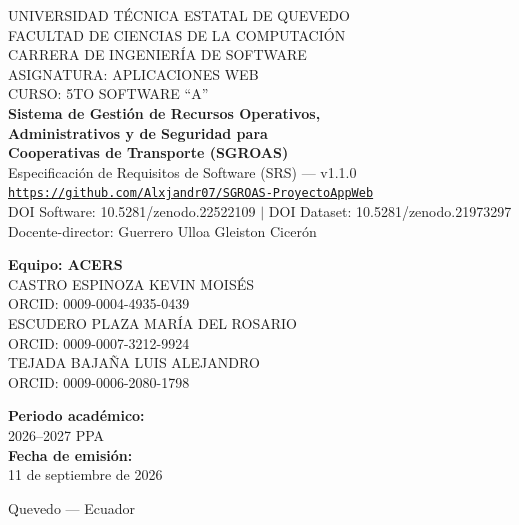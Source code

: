 \documentclass[12pt,a4paper]{article}
\begin{document}
\begin{titlepage}
\centering
\vspace*{0.6cm}
{\Large UNIVERSIDAD TÉCNICA ESTATAL DE QUEVEDO}\\[0.2cm]
{\Large FACULTAD DE CIENCIAS DE LA COMPUTACIÓN}\\[0.2cm]
{\Large CARRERA DE INGENIERÍA DE SOFTWARE}\\[0.4cm]
{\large ASIGNATURA: APLICACIONES WEB}\\[0.2cm]
{\large CURSO: 5TO SOFTWARE ``A''}\\[1.2cm]
{\LARGE \textbf{Sistema de Gestión de Recursos Operativos,}}\\[0.2cm]
{\LARGE \textbf{Administrativos y de Seguridad para}}\\[0.2cm]
{\LARGE \textbf{Cooperativas de Transporte (SGROAS)}}\\[0.6cm]
{\large Especificación de Requisitos de Software (SRS) --- v1.1.0}\\[0.4cm]
{\small \texttt{\href{https://github.com/Alxjandr07/SGROAS-ProyectoAppWeb}{https://github.com/Alxjandr07/SGROAS-ProyectoAppWeb}}}\\[0.2cm]
{\small DOI Software: 10.5281/zenodo.22522109 $\vert$ DOI Dataset: 10.5281/zenodo.21973297}\\[1.0cm]
{\small Docente-director: Guerrero Ulloa Gleiston Cicerón}\\[0.8cm]
\begin{minipage}{0.5\textwidth}
\centering
\textbf{Equipo: ACERS}\\[0.4cm]
CASTRO ESPINOZA KEVIN MOISÉS\\
\textsc{ORCID: 0009-0004-4935-0439}\\[0.3cm]
ESCUDERO PLAZA MARÍA DEL ROSARIO\\
\textsc{ORCID: 0009-0007-3212-9924}\\[0.3cm]
TEJADA BAJAÑA LUIS ALEJANDRO\\
\textsc{ORCID: 0009-0006-2080-1798}
\end{minipage}
\hfill
\begin{minipage}{0.4\textwidth}
\centering
\textbf{Periodo académico:}\\
2026--2027 PPA\\[0.8cm]
\textbf{Fecha de emisión:}\\
11 de septiembre de 2026
\end{minipage}
\vfill
{\small Quevedo --- Ecuador}
\end{titlepage}
\end{document}
